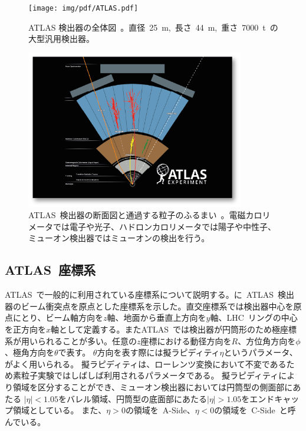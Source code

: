 \begin{figure}[tbp]
    \centering   
    \texttt{[image: img/pdf/ATLAS.pdf]}
    \caption[ATLAS 検出器の全体図]{ATLAS 検出器の全体図~\cite{TR:01}。直径~25~m,~長さ~44~m,~重さ~7000~t~の大型汎用検出器。}\label{fig:atlasdet}
\end{figure}

\begin{figure}[htbp]
    \centering   
    \includegraphics[width=0.85\textwidth]{img/jpeg/how.png}
    \caption[ATLAS~検出器の断面図と通過する粒子のふるまい]{ATLAS~検出器の断面図と通過する粒子のふるまい~\cite{URL:02}。電磁カロリメータでは電子や光子、ハドロンカロリメータでは陽子や中性子、ミューオン検出器ではミューオンの検出を行う。}
    \label{fig:disp}
\end{figure}

\subsection{ATLAS~座標系}
ATLAS~で一般的に利用されている座標系について説明する。に~ATLAS~検出器のビーム衝突点を原点とした座標系を示した。直交座標系では検出器中心を原点にとり、ビーム軸方向を$z$軸、地面から垂直上方向を$y$軸、LHC~リングの中心を正方向を$x$軸として定義する。またATLAS~では検出器が円筒形のため極座標系が用いられることが多い。任意の$z$座標における動径方向を$R$、方位角方向を$\phi$、極角方向を$\theta$で表す。
$\theta$方向を表す際には擬ラピディティ$\eta$というパラメータ、がよく用いられる。
擬ラピディティは、ローレンツ変換において不変であるため素粒子実験ではしばしば利用されるパラメータである。
擬ラピディティにより領域を区分することができ、ミューオン検出器においては円筒型の側面部にあたる
$|\eta| < 1.05$をバレル領域、円筒型の底面部にあたる$|\eta| > 1.05$をエンドキャップ領域としている。
また、$\eta>0$の領域を~A-Side、$\eta<0$の領域を~C-Side~と呼んでいる。

